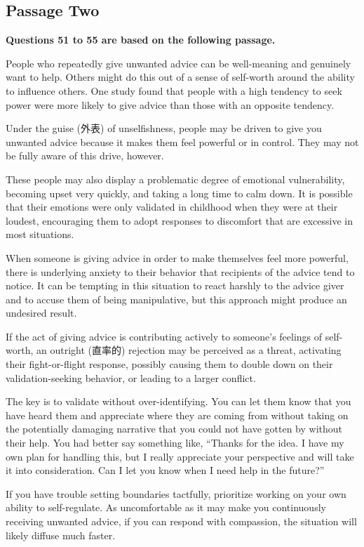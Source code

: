 \documentclass[UTF8,11pt]{ctexart}
\begin{document}
\subsection*{\textbf{Passage Two}}


\textbf{Questions 51 to 55 are based on the following passage.}


People who repeatedly give unwanted advice can be well-meaning and genuinely want to help. Others might do this out of a sense of self-worth around the ability to influence others. One study found that people with a high tendency to seek power were more likely to give advice than those with an opposite tendency.


Under the guise (外表) of unselfishness, people may be driven to give you unwanted advice because it makes them feel powerful or in control. They may not be fully aware of this drive, however.


These people may also display a problematic degree of emotional vulnerability, becoming upset very quickly, and taking a long time to calm down. It is possible that their emotions were only validated in childhood when they were at their loudest, encouraging them to adopt responses to discomfort that are excessive in most situations.


When someone is giving advice in order to make themselves feel more powerful, there is underlying anxiety to their behavior that recipients of the advice tend to notice. It can be tempting in this situation to react harshly to the advice giver and to accuse them of being manipulative, but this approach might produce an undesired result.


If the act of giving advice is contributing actively to someone’s feelings of self-worth, an outright (直率的) rejection may be perceived as a threat, activating their fight-or-flight response, possibly causing them to double down on their validation-seeking behavior, or leading to a larger conflict.


The key is to validate without over-identifying. You can let them know that you have heard them and appreciate where they are coming from without taking on the potentially damaging narrative that you could not have gotten by without their help. You had better say something like, “Thanks for the idea. I have my own plan for handling this, but I really appreciate your perspective and will take it into consideration. Can I let you know when I need help in the future?”


If you have trouble setting boundaries tactfully, prioritize working on your own ability to self-regulate. As uncomfortable as it may make you continuously receiving unwanted advice, if you can respond with compassion, the situation will likely diffuse much faster.
\end{document}

